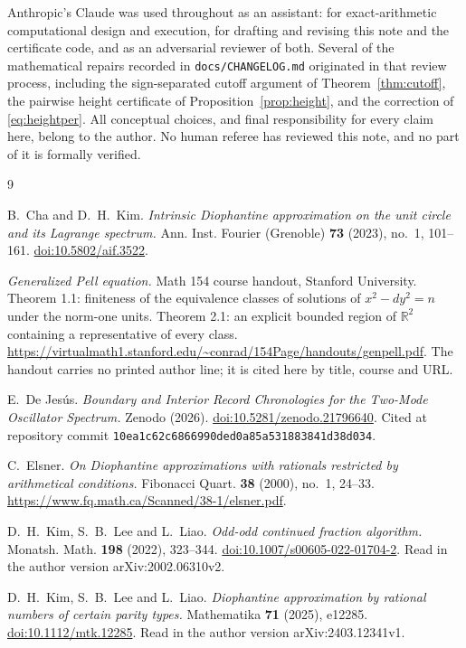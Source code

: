 \documentclass[11pt]{article}
\theoremstyle{definition}
\theoremstyle{remark}
\begin{document}
Anthropic's Claude was used throughout as an assistant: for exact-arithmetic computational
design and execution, for drafting and revising this note and the certificate code, and as an
adversarial reviewer of both. Several of the mathematical repairs recorded in
\texttt{docs/CHANGELOG.md} originated in that review process, including the sign-separated
cutoff argument of Theorem~\ref{thm:cutoff}, the pairwise height certificate of
Proposition~\ref{prop:height}, and the correction of \eqref{eq:heightper}. All conceptual
choices, and final responsibility for every claim here, belong to the author. No human referee
has reviewed this note, and no part of it is formally verified.

\begin{thebibliography}{9}

 B.~Cha and D.~H.~Kim.
\emph{Intrinsic Diophantine approximation on the unit circle and its Lagrange spectrum.}
Ann. Inst. Fourier (Grenoble) \textbf{73} (2023), no.~1, 101--161.
\href{https://doi.org/10.5802/aif.3522}{doi:10.5802/aif.3522}.

 \emph{Generalized Pell equation.} Math 154 course handout, Stanford
University. Theorem 1.1: finiteness of the equivalence classes of solutions of $x^2-dy^2=n$
under the norm-one units. Theorem 2.1: an explicit bounded region of $\mathbb{R}^2$ containing
a representative of every class.
\url{https://virtualmath1.stanford.edu/~conrad/154Page/handouts/genpell.pdf}.
The handout carries no printed author line; it is cited here by title, course and URL.

 E.~De Jes\'us.
\emph{Boundary and Interior Record Chronologies for the Two-Mode Oscillator Spectrum.}
Zenodo (2026). \href{https://doi.org/10.5281/zenodo.21796640}{doi:10.5281/zenodo.21796640}.
Cited at repository commit \texttt{10ea1c62c6866990ded0a85a531883841d38d034}.

 C.~Elsner.
\emph{On Diophantine approximations with rationals restricted by arithmetical conditions.}
Fibonacci Quart. \textbf{38} (2000), no.~1, 24--33.
\url{https://www.fq.math.ca/Scanned/38-1/elsner.pdf}.

 D.~H.~Kim, S.~B.~Lee and L.~Liao.
\emph{Odd-odd continued fraction algorithm.}
Monatsh. Math. \textbf{198} (2022), 323--344.
\href{https://doi.org/10.1007/s00605-022-01704-2}{doi:10.1007/s00605-022-01704-2}.
Read in the author version arXiv:2002.06310v2.

 D.~H.~Kim, S.~B.~Lee and L.~Liao.
\emph{Diophantine approximation by rational numbers of certain parity types.}
Mathematika \textbf{71} (2025), e12285.
\href{https://doi.org/10.1112/mtk.12285}{doi:10.1112/mtk.12285}.
Read in the author version arXiv:2403.12341v1.

\end{thebibliography}
\end{document}

